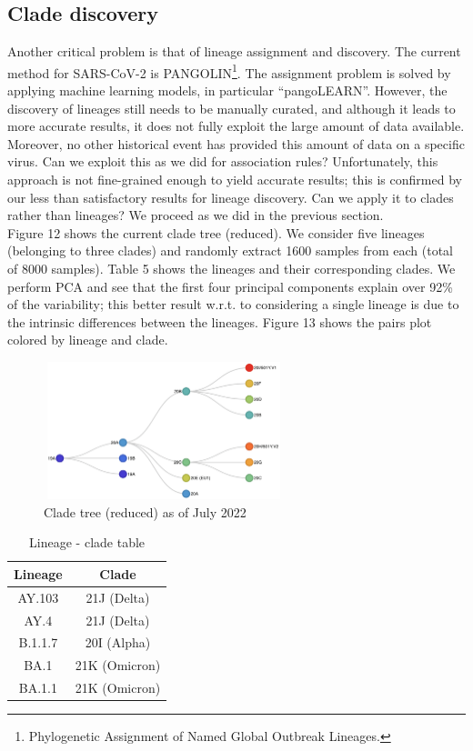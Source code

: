 \documentclass[twoside,twocolumn]{article}
\begin{document}
	\subsection{Clade discovery}
	Another critical problem is that of lineage assignment and discovery. The current method for SARS-CoV-2 is PANGOLIN\footnote{Phylogenetic Assignment of Named Global Outbreak Lineages.}\cite{pango}. The assignment problem is solved by applying machine learning models, in particular \textquotedblleft pangoLEARN\textquotedblright\cite{pangolearn}. However, the discovery of lineages still needs to be manually curated, and although it leads to more accurate results, it does not fully exploit the large amount of data available. Moreover, no other historical event has provided this amount of data on a specific virus. Can we exploit this as we did for association rules? Unfortunately, this approach is not fine-grained enough to yield accurate results; this is confirmed by our less than satisfactory results for lineage discovery. Can we apply it to clades rather than lineages? We proceed as we did in the previous section.
	\\Figure 12 shows the current clade tree (reduced). We consider five lineages (belonging to three clades) and randomly extract 1600 samples from each (total of 8000 samples). Table 5 shows the lineages and their corresponding clades. We perform PCA and see that the first four principal components explain over 92\% of the variability; this better result w.r.t. to considering a single lineage is due to the intrinsic differences between the lineages. Figure 13 shows the pairs plot colored by lineage and clade.
	\begin{figure}[h]
		\caption{Clade tree (reduced) as of July 2022}
		\label{clades}
		\centering
		\includegraphics[width=70mm, height=40mm]{clades.png}
	\end{figure}
	\begin{table}
		\caption{Lineage - clade table}
		\centering
		\renewcommand{\tabcolsep}{2pc} %
		\renewcommand{\arraystretch}{1.2} %
		\begin{tabular}{| c | c |}
			\hline
			Lineage & Clade \\
			\hline
			AY.103 & 21J (Delta) \\
			AY.4 & 21J (Delta) \\
			B.1.1.7 & 20I (Alpha) \\
			BA.1 & 21K (Omicron) \\
			BA.1.1 & 21K (Omicron)\\
			\hline
		\end{tabular}
	\end{table}
\end{document}
